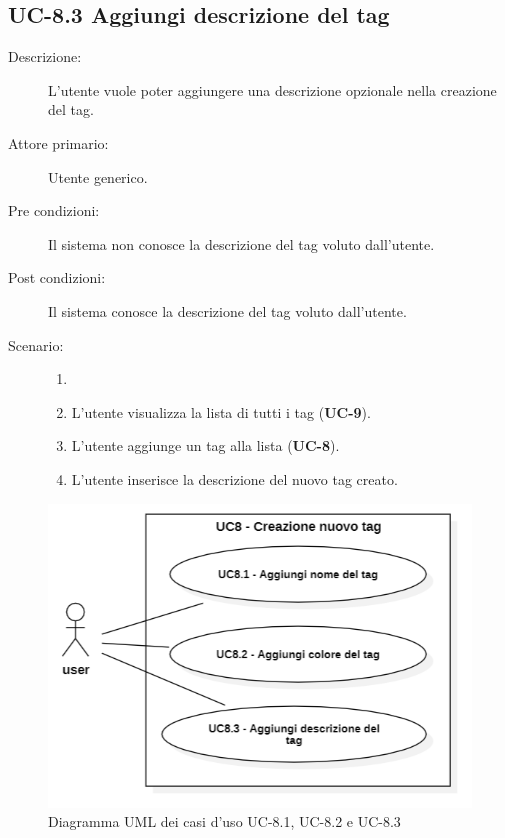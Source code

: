 \subsection{UC-8.3 Aggiungi descrizione del tag}
\begin{description}
    \item[Descrizione:] L’utente vuole poter aggiungere una descrizione opzionale nella creazione del tag.
    \item[Attore primario:] Utente generico.
    \item[Pre condizioni:] Il sistema non conosce la descrizione  del tag voluto dall’utente.
    \item[Post condizioni:] Il sistema conosce la descrizione del tag voluto dall’utente.
    \item[Scenario:]
    \begin{enumerate}
        \item[]
        \item L’utente visualizza la lista di tutti i tag (\textbf{UC-9}).
        \item L'utente aggiunge un tag alla lista (\textbf{UC-8}).
        \item L'utente inserisce la descrizione del nuovo tag creato.
    \end{enumerate}
\end{description}
\begin{figure}[H]
    \centering
    \includegraphics[width=0.8\linewidth]{UC8.1.png} 
    \caption{Diagramma UML dei casi d'uso UC-8.1, UC-8.2 e UC-8.3}
    \label{fig:UC8.1-2-3}
\end{figure}

